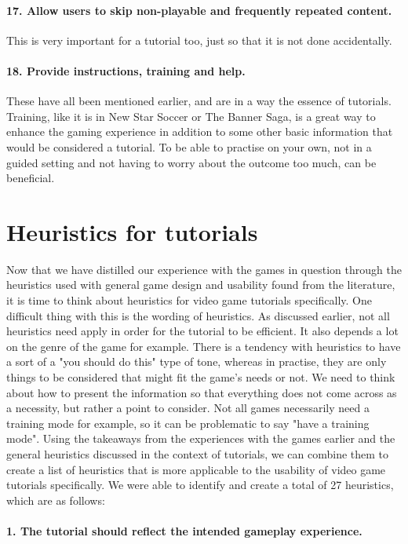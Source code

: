 \paragraph{17. Allow users to skip non-playable and frequently repeated content.} This is very important for a tutorial too, just so that it is not done accidentally.

\paragraph{18. Provide instructions, training and help.} These have all been mentioned earlier, and are in a way the essence of tutorials. Training, like it is in New Star Soccer or The Banner Saga, is a great way to enhance the gaming experience in addition to some other basic information that would be considered a tutorial. To be able to practise on your own, not in a guided setting and not having to worry about the outcome too much, can be beneficial.

\section{Heuristics for tutorials}
Now that we have distilled our experience with the games in question through the heuristics used with general game design and usability found from the literature, it is time to think about heuristics for video game tutorials specifically. One difficult thing with this is the wording of heuristics. As discussed earlier, not all heuristics need apply in order for the tutorial to be efficient. It also depends a lot on the genre of the game for example. There is a tendency with heuristics to have a sort of a "you should do this" type of tone, whereas in practise, they are only things to be considered that might fit the game's needs or not. We need to think about how to present the information so that everything does not come across as a necessity, but rather a point to consider. Not all games necessarily need a training mode for example, so it can be problematic to say "have a training mode". Using the takeaways from the experiences with the games earlier and the general heuristics discussed in the context of tutorials, we can combine them to create a list of heuristics that is more applicable to the usability of video game tutorials specifically. We were able to identify and create a total of 27 heuristics, which are as follows:

\paragraph{1. The tutorial should reflect the intended gameplay experience.} 
